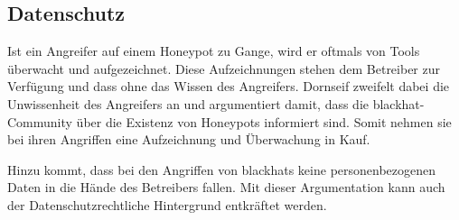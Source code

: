 \subsection{Datenschutz}
Ist ein Angreifer auf einem Honeypot zu Gange, wird er oftmals von Tools überwacht und aufgezeichnet. Diese Aufzeichnungen stehen dem Betreiber zur Verfügung und dass ohne das Wissen des Angreifers. Dornseif zweifelt dabei die Unwissenheit des Angreifers an und argumentiert damit, dass die blackhat-Community über die Existenz von Honeypots informiert sind. Somit nehmen sie bei ihren Angriffen eine Aufzeichnung und Überwachung in Kauf. 

Hinzu kommt, dass bei den Angriffen von blackhats keine personenbezogenen Daten in die Hände des Betreibers fallen. Mit dieser Argumentation kann auch der Datenschutzrechtliche Hintergrund entkräftet werden.	